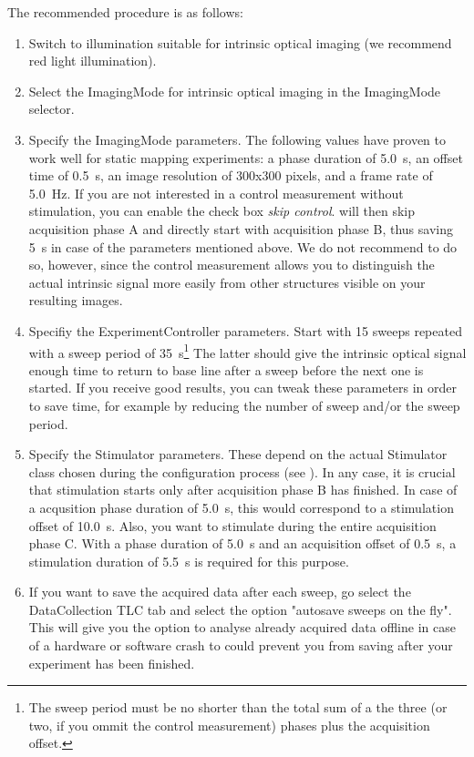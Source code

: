 The recommended procedure is as follows:
\begin{enumerate}
	\item Switch to illumination suitable for intrinsic optical imaging (we recommend red light illumination).
	\item Select the ImagingMode for intrinsic optical imaging in the ImagingMode selector.
	\item Specify the ImagingMode parameters. The following values have proven to work well for static mapping experiments: a phase duration of \SI{5.0}{\s}, an offset time of \SI{0.5}{\s}, an image resolution of 300x300 pixels, and a frame rate of \SI{5.0}{\Hz}. If you are not interested in a control measurement without stimulation, you can enable the check box \textit{skip control}. \HS will then skip acquisition phase A and directly start with acquisition phase B, thus saving \SI{5}{\s} in case of the parameters mentioned above. We do not recommend to do so, however, since the control measurement allows you to distinguish the actual intrinsic signal more easily from other structures visible on your resulting images.
	\item Specifiy the ExperimentController parameters. Start with 15 sweeps repeated with a sweep period of \SI{35}{\s}\footnote{The sweep period must be no shorter than the total sum of a the three (or two, if you ommit the control measurement) phases plus the acquisition offset.} The latter should give the intrinsic optical signal enough time to return to base line after a sweep before the next one is started. If you receive good results, you can tweak these parameters in order to save time, for example by reducing the number of sweep and/or the sweep period.
	\item Specify the Stimulator parameters. These depend on the actual Stimulator class chosen during the configuration process (see ). In any case, it is crucial that stimulation starts only after acquisition phase B has finished. In case of a acqusition phase duration of \SI{5.0}{\s}, this would correspond to a stimulation offset of \SI{10.0}{\s}. Also, you want to stimulate during the entire acquisition phase C. With a phase duration of \SI{5.0}{\s} and an acquisition offset of \SI{0.5}{\s}, a stimulation duration of \SI{5.5}{\s} is required for this purpose.
	\item If you want to save the acquired data after each sweep, go select the DataCollection \ac{TLC} tab and select the option "autosave sweeps on the fly". This will give you the option to analyse already acquired data offline in case of a hardware or software crash to could prevent you from saving after your experiment has been finished.

\end{enumerate}
